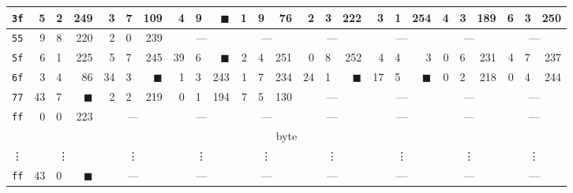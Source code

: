 \begin{tabular}{| c | r@{.} l@{\quad}r | r@{.} l@{\quad}r | r@{.} l@{\quad}r | r@{.} l@{\quad}r | r@{.} l@{\quad}r | r@{.} l@{\quad}r | r@{.} l@{\quad}r | r@{.} l@{\quad}r |}
	\hline
	{\tt 3f}&5&2&249&3&7&109&4&9&{\weak$\blacksquare$}&1&9&76&2&3&222&3&1&254&4&3&189&6&3&250\\
	\hline
	{\tt 55}&9&8&220&2&0&239&\multicolumn{3}{c|}{---}&\multicolumn{3}{c|}{---}&\multicolumn{3}{c|}{---}&\multicolumn{3}{c|}{---}&\multicolumn{3}{c|}{---}&\multicolumn{3}{c|}{---}\\
	\hline
	{\tt 5f}&6&1&225&5&7&245&39&6&{$\blacksquare$}&2&4&251&0&8&252&4&4&3&0&6&231&4&7&237\\
	\hline
	{\tt 6f}&3&4&86&34&3&{$\blacksquare$}&1&3&243&1&7&234&24&1&{$\blacksquare$}&17&5&{$\blacksquare$}&0&2&218&0&4&244\\
	\hline
	{\tt 77}&43&7&{$\blacksquare$}&2&2&219&0&1&194&7&5&130&\multicolumn{3}{c|}{---}&\multicolumn{3}{c|}{---}&\multicolumn{3}{c|}{---}&\multicolumn{3}{c|}{---}\\
	\hline
	{\tt ff}&0&0&223&\multicolumn{3}{c|}{---}&\multicolumn{3}{c|}{---}&\multicolumn{3}{c|}{---}&\multicolumn{3}{c|}{---}&\multicolumn{3}{c|}{---}&\multicolumn{3}{c|}{---}&\multicolumn{3}{c|}{---}\\
	\hline
	\hline
	\multicolumn{25}{|c|}{\nth{4} byte} \\
	\hline
	\vdots & \multicolumn{3}{c|}{\vdots} & \multicolumn{3}{c|}{\vdots} & \multicolumn{3}{c|}{\vdots} & \multicolumn{3}{c|}{\vdots} & \multicolumn{3}{c|}{\vdots} & \multicolumn{3}{c|}{\vdots} & \multicolumn{3}{c|}{\vdots} & \multicolumn{3}{c|}{\vdots} \\
	\hline
	{\tt ff}&43&0&{$\blacksquare$}&\multicolumn{3}{c|}{---}&\multicolumn{3}{c|}{---}&\multicolumn{3}{c|}{---}&\multicolumn{3}{c|}{---}&\multicolumn{3}{c|}{---}&\multicolumn{3}{c|}{---}&\multicolumn{3}{c|}{---}\\
	\hline
\end{tabular}